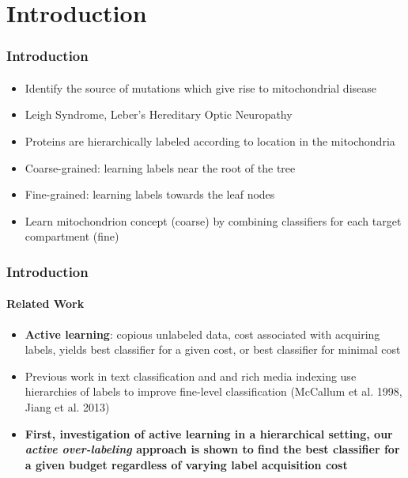 \documentclass{beamer}
\begin{document}
\section{Introduction}
\begin{frame}
    \frametitle{Introduction}   %
    \framesubtitle{}
    \begin{itemize}
      \item Identify the source of mutations which give rise to mitochondrial disease
      \item Leigh Syndrome, Leber's Hereditary Optic Neuropathy %
      \item Proteins are hierarchically labeled according to location in the mitochondria
      \item Coarse-grained: learning labels near the root of the tree
      \item Fine-grained: learning labels towards the leaf nodes
      \item Learn mitochondrion concept (coarse) by combining classifiers for each target compartment (fine)
    \end{itemize}
\end{frame}
\begin{frame}
    \frametitle{Introduction}     %
    \framesubtitle{Related Work}
    \begin{itemize}
      \item \textbf{Active learning}: copious unlabeled data, cost associated with acquiring labels,
      yields best classifier for a given cost, or best classifier for minimal cost
      \item Previous work in text classification and and rich media indexing use hierarchies of
      labels to improve fine-level classification (McCallum et al. 1998, Jiang et al. 2013)
      \item \textbf{First, investigation of active learning in a hierarchical setting, our \textit{active over-labeling} approach is
      shown to find the best classifier for a given budget regardless of varying label acquisition cost}
    \end{itemize}
\end{frame}
\end{document}

